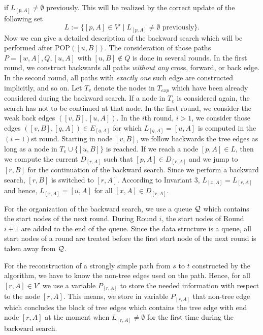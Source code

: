 \documentclass[12pt,twoside,a4paper]{article}
\begin{document}
if $L_{[p,A]} \not= \emptyset$ previously. This will be realized by the correct 
update of the following set
$$L := \{[p,A] \in V' \mid L_{[p,A]} \not= \emptyset \mbox{ previously}\}.$$
Now we can give a detailed description of the backward search which will be 
performed after POP$([u,B])$.
The consideration of those paths $P = [w,A],Q,[u,A]$ with $[u,B] \not\in Q$
is done in several rounds.
In the first round, we construct backwards all paths {\em without any\/} cross,
forward, or back edge.
In the second round, all paths with {\em exactly one} such edge are constructed
implicitly, and so on.
Let $T_v$ denote the nodes in $T_{exp}$ which have been already considered during 
the backward search. If a node in $T_v$ is considered again, the search has not 
to be continued at that node.
In the first round, we consider the weak back edges $([v,B],[u,A])$. In the $i$th
round, $i > 1$, we consider those edges $([v,B],[q,A]) \in E_{[q,A]}$ for which
$L_{[q,A]} = [u,A]$ is computed in the $(i-1)$st round.
Starting in node $[v,B]$, we follow backwards the tree edges as long as 
a node in $T_v \cup \{[u,B]\}$ is reached. If we reach a node $[p,A] \in L$, then 
we compute the current $D_{[r,A]}$ such that $[p,A] \in D_{[r,A]}$ and we jump to
$[r,B]$ for the continuation of the backward search. Since we perform a backward
search, $[r,B]$ is switched to $[r,A]$. According to 
Invariant 3, $L_{[x,A]} = L_{[r,A]}$ and hence, $L_{[x,A]} = [u,A]$ for all 
$[x,A] \in D_{[r,A]}$. 

For the organization of the backward search, we use a queue $\cal{Q}$ which contains
the start nodes of the next round. During Round $i$, the start nodes of Round $i+1$ 
are added to the end of the queue. Since the data structure is a queue, all start
nodes of a round are treated before the first start node of the next round is taken
away from $\cal{Q}$.

For the reconstruction of a strongly simple path from $s$ to $t$ constructed
by the algorithm, we have to know the non-tree edges used on the path. Hence, 
for all $[r,A]\in V'$ we use a variable $P_{[r,A]}$ to store the needed information
with respect to the node $[r,A]$. This means, we store in variable $P_{[r,A]}$ that non-tree
edge which concludes the block of tree edges which contains the tree edge with end 
node $[r,A]$ at the moment when $L_{[r,A]} \not= \emptyset$ for the first time 
during the backward search.
\end{document}
